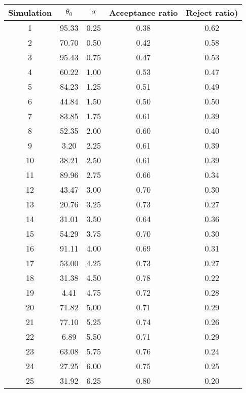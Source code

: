 \begin{center}
\begin{table}\label{tb: Simulation Metropolis}
\begin{tabular}{|ccccc|}\hline 
Simulation & $\theta_0$ & $\sigma$ & Acceptance ratio & Reject ratio)\\ \hline 
1 &    95.33 &     0.25 &     0.38 &     0.62 \\  \hline 
2 &    70.70 &     0.50 &     0.42 &     0.58 \\  
3 &    95.43 &     0.75 &     0.47 &     0.53 \\  
4 &    60.22 &     1.00 &     0.53 &     0.47 \\  
5 &    84.23 &     1.25 &     0.51 &     0.49 \\  
6 &    44.84 &     1.50 &     0.50 &     0.50 \\  
7 &    83.85 &     1.75 &     0.61 &     0.39 \\  
8 &    52.35 &     2.00 &     0.60 &     0.40 \\  
9 &     3.20 &     2.25 &     0.61 &     0.39 \\  
10 &    38.21 &     2.50 &     0.61 &     0.39 \\  
11 &    89.96 &     2.75 &     0.66 &     0.34 \\  
12 &    43.47 &     3.00 &     0.70 &     0.30 \\  
13 &    20.76 &     3.25 &     0.73 &     0.27 \\  
14 &    31.01 &     3.50 &     0.64 &     0.36 \\  
15 &    54.29 &     3.75 &     0.70 &     0.30 \\  
16 &    91.11 &     4.00 &     0.69 &     0.31 \\  
17 &    53.00 &     4.25 &     0.73 &     0.27 \\  
18 &    31.38 &     4.50 &     0.78 &     0.22 \\  
19 &     4.41 &     4.75 &     0.72 &     0.28 \\  
20 &    71.82 &     5.00 &     0.71 &     0.29 \\  
21 &    77.10 &     5.25 &     0.74 &     0.26 \\  
22 &     6.89 &     5.50 &     0.71 &     0.29 \\  
23 &    63.08 &     5.75 &     0.76 &     0.24 \\  
24 &    27.25 &     6.00 &     0.75 &     0.25 \\  
25 &    31.92 &     6.25 &     0.80 &     0.20 \\  

\end{tabular}
\end{table}
\end{center}
